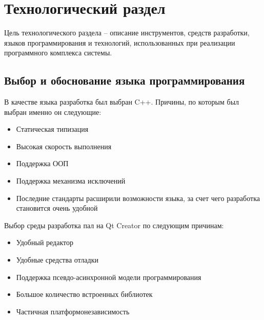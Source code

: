 \chapter{Технологический раздел}
Цель технологического раздела – описание инструментов, средств разработки, языков программирования и технологий, использованных при реализации программного комплекса системы.
\section{Выбор и обоснование языка программирования}
В качестве языка разработка был выбран C++. Причины, по которым был выбран именно он следующие:
\begin{itemize}
	\item Статическая типизация
	\item Высокая скорость выполнения
	\item Поддержка ООП
	\item Поддержка механизма исключений
	\item Последние стандарты расширили возможности языка, за счет чего разработка становится очень удобной
\end{itemize}

Выбор среды разработка пал на Qt Creator по следующим причинам:
\begin{itemize}
	\item Удобный редактор
	\item Удобные средства отладки
	\item Поддержка псевдо-асинхронной модели программирования
	\item Большое количество встроенных библиотек
	\item Частичная платформонезависимость
\end{itemize}

